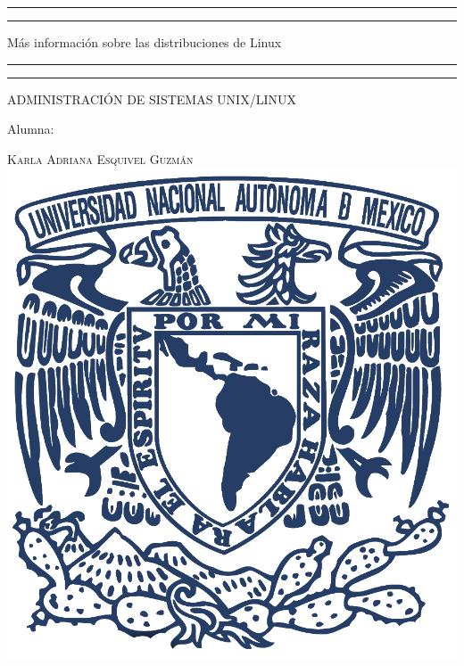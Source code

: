 \documentclass[a4paper, 11pt, oneside]{article}
\begin{document}
 

\begin{titlepage} 

	\centering 
	
	\scshape 
	
	\vspace*{\baselineskip} 
	
	
	
	\rule{\textwidth}{1.6pt}\vspace*{-\baselineskip}\vspace*{2pt} 
	\rule{\textwidth}{0.4pt} 
	
	\vspace{0.75\baselineskip} 
	
	{\LARGE Más información sobre las distribuciones de Linux}	
	\vspace{0.75\baselineskip} 
	
	\rule{\textwidth}{0.4pt}\vspace*{-\baselineskip}\vspace{3.2pt}
	\rule{\textwidth}{1.6pt} 
	
	\vspace{2\baselineskip} 
	

	ADMINISTRACIÓN DE SISTEMAS UNIX/LINUX
	
	\vspace*{3\baselineskip} 
	
	
	
	Alumna:
	
	\vspace{0.5\baselineskip} 
	
	{\scshape\Large Karla Adriana Esquivel Guzmán \\} 
	\vspace{0.5\baselineskip} 
	\vfill
	\includegraphics{unam.jpg}
	

\end{titlepage}
\end{document}
